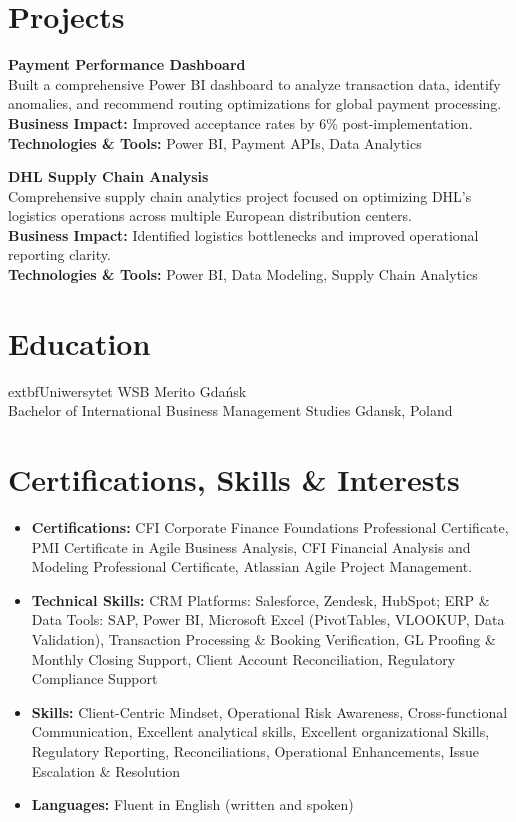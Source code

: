 \documentclass[letterpaper,11pt]{article}
\begin{document}
\section*{Projects}

  \textbf{Payment Performance Dashboard} \\
Built a comprehensive Power BI dashboard to analyze transaction data, identify anomalies, and recommend routing optimizations for global payment processing. \\
\textbf{Business Impact:} Improved acceptance rates by 6\% post-implementation. \\
\textbf{Technologies \& Tools:} Power BI, Payment APIs, Data Analytics

  \textbf{DHL Supply Chain Analysis} \\
Comprehensive supply chain analytics project focused on optimizing DHL's logistics operations across multiple European distribution centers. \\
\textbf{Business Impact:} Identified logistics bottlenecks and improved operational reporting clarity. \\
\textbf{Technologies \& Tools:} Power BI, Data Modeling, Supply Chain Analytics

\section*{Education}

  extbf{Uniwersytet WSB Merito Gdańsk} \\
Bachelor of International Business Management Studies \hfill Gdansk, Poland

\section*{Certifications, Skills \& Interests}
\begin{itemize}
    \item \textbf{Certifications:} CFI Corporate Finance Foundations Professional Certificate, PMI Certificate in Agile Business Analysis, CFI Financial Analysis and Modeling Professional Certificate, Atlassian Agile Project Management.
    \item \textbf{Technical Skills:} CRM Platforms: Salesforce, Zendesk, HubSpot; ERP \& Data Tools: SAP, Power BI, Microsoft Excel (PivotTables, VLOOKUP, Data Validation), Transaction Processing \& Booking Verification, GL Proofing \& Monthly Closing Support, Client Account Reconciliation, Regulatory Compliance Support
    \item \textbf{Skills:} Client-Centric Mindset, Operational Risk Awareness, Cross-functional Communication, Excellent analytical skills, Excellent organizational Skills, Regulatory Reporting, Reconciliations, Operational Enhancements, Issue Escalation \& Resolution
    \item \textbf{Languages:} Fluent in English (written and spoken)
\end{itemize}
\end{document}
